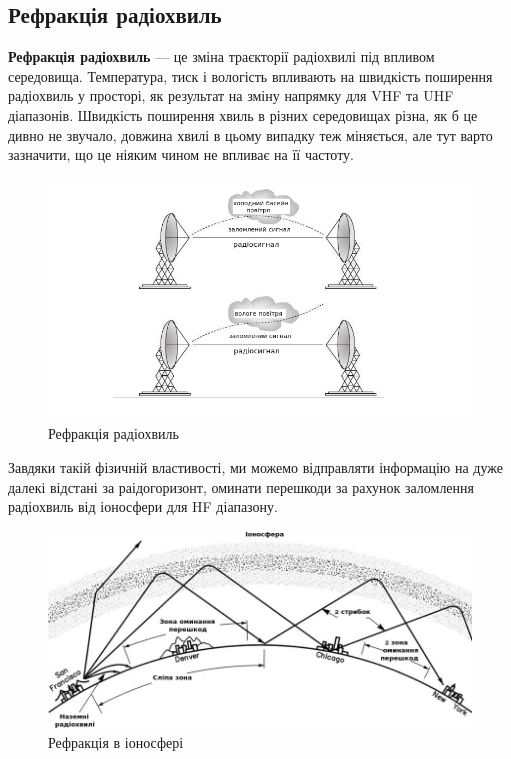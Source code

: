 \documentclass{article}
\begin{document}
\newpage
\subsection{Рефракція радіохвиль}

\textbf{Рефракція радіохвиль} --- це зміна траєкторії радіохвилі під впливом середовища. Температура, тиск і вологість впливають на швидкість поширення радіохвиль у просторі, як результат на зміну напрямку для VHF та UHF діапазонів. Швидкість поширення хвиль в різних середовищах різна, як б це дивно не звучало, довжина хвилі в цьому випадку теж міняється, але тут варто зазначити, що це ніяким чином не впливає на її частоту.  

\begin{figure}[h!]
	\centering
	\includegraphics[width=0.8\linewidth]{images/refraction.png}
	\caption{\label{fig:refraction}Рефракція радіохвиль}
\end{figure}


Завдяки такій фізичній властивості, ми можемо відправляти інформацію на дуже далекі відстані за раідогоризонт, оминати перешкоди за рахунок заломлення радіохвиль від іоносфери для HF діапазону.

\begin{figure}[h!]
	\centering
	\includegraphics[width=0.8\linewidth]{images/refraction2.png}
	\caption{\label{fig:refraction2}Рефракція в іоносфері}
\end{figure}
\end{document}
